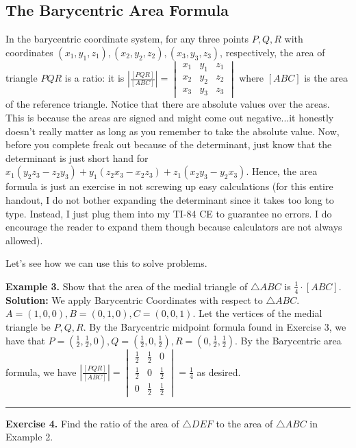 \documentclass{article}
\begin{document}
\subsection{The Barycentric Area Formula}
In the barycentric coordinate system, for any three points $P,Q,R$ with coordinates $(x_1,y_1,z_1),(x_2,y_2,z_2),(x_3,y_3,z_3)$, respectively, the area of triangle $PQR$ is a ratio: it is $|\frac{[PQR]}{[ABC]}|=
\begin{vmatrix}
x_{1} &y_{1}  &z_{1} \\ 
x_{2} &y_{2}  &z_{2} \\ 
 x_{3}& y_{3} & z_{3}
\end{vmatrix}$ where $[ABC]$ is the area of the reference triangle. Notice that there are absolute values over the areas. This is because the areas are signed and might come out negative...it honestly doesn't really matter as long as you remember to take the absolute value. Now, before you complete freak out because of the determinant, just know that the determinant is just short hand for $x_1(y_2z_3-z_2y_3)+y_1(z_2x_3-x_2z_3)+z_1(x_2y_3-y_2x_3)$. Hence, the area formula is just an exercise in not screwing up easy calculations (for this entire handout, I do not bother expanding the determinant since it takes too long to type. Instead, I just plug them into my TI-84 CE to guarantee no errors. I do encourage the reader to expand them though because calculators are not always allowed).

Let's see how we can use this to solve problems.
\vspace{.2in}

\textbf{Example 3.} Show that the area of the medial triangle of $\triangle ABC$ is $\frac 14 \cdot [ABC]$. 
\textbf{Solution:} We apply Barycentric Coordinates with respect to $\triangle ABC$. $A=(1,0,0),B=(0,1,0),C=(0,0,1)$. Let the vertices of the medial triangle be $P,Q,R$. By the Barycentric midpoint formula found in Exercise 3, we have that $P=(\frac 12,\frac 12,0),Q=(\frac 12,0,\frac 12),R=(0,\frac 12,\frac 12)$. By the Barycentric area formula, we have $|\frac{[PQR]}{[ABC]}|=
\begin{vmatrix}
\frac 12 &\frac 12  &0 \\ 
\frac 12 &0 &\frac 12 \\ 
 0& \frac 12 & \frac 12
\end{vmatrix}=\frac 14$ as desired.
\vspace{.2in}
\hrule
\vspace{.2in}
\textbf{Exercise 4.} Find the ratio of the area of $\triangle DEF$ to the area of $\triangle ABC$ in Example 2.
\end{document}
